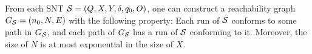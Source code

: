 {\begin{proposition}\label{prop-snt-norm}
	From each SNT ${\mathcal{S} }=(Q, X, Y, \delta, q_0, O)$, one can construct a  reachability graph $G_{\mathcal{S} }=(n_0,N, E)$ with the following property: Each run of ${\mathcal{S} }$ conforms to some path in $G_{\mathcal{S} }$, and each path of $G_{\mathcal{S} }$ has a run of ${\mathcal{S} }$ conforming to it.  
Moreover, the size of $N$ is at most exponential in the size of $X$. 
\end{proposition}
}

%

